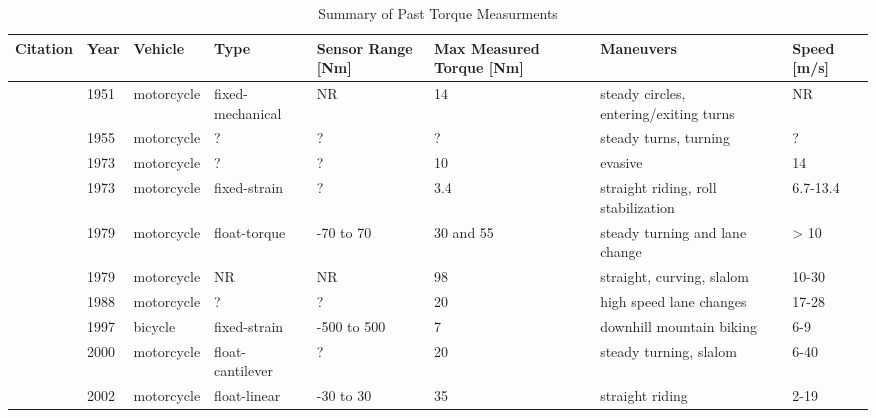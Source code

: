 \documentclass[10pt]{article}
\begin{document}
\begin{table}[!ht]
  \caption{Summary of Past Torque Measurments}
  \begin{tabular}{llllllll}
    \toprule
    Citation                              &  Year &     Vehicle &              Type & Sensor Range [Nm] & Max Measured Torque [Nm] &                               Maneuvers & Speed [m/s] \\
    \midrule
    \cite{Wilson-Jones1951}               &  1951 &  motorcycle &  fixed-mechanical &                NR &                       14 &  steady circles, entering/exiting turns &          NR \\
    \cite{Kondo1955}                      &  1955 &  motorcycle &                 ? &                 ? &                        ? &                   steady turns, turning &           ? \\
    \cite{Watanabe1973}                   &  1973 &  motorcycle &                 ? &                 ? &                       10 &                                 evasive &          14 \\
    \cite{Eaton1973}                      &  1973 &  motorcycle &      fixed-strain &                 ? &                      3.4 &     straight riding, roll stabilization &    6.7-13.4 \\
    \cite{Weir1979a}                      &  1979 &  motorcycle &      float-torque &         -70 to 70 &                30 and 55 &          steady turning and lane change &        > 10 \\
    \cite{Aoki}                           &  1979 &  motorcycle &                NR &                NR &                       98 &               straight, curving, slalom &       10-30 \\
    \cite{Sugizaki1988}                   &  1988 &  motorcycle &                 ? &                 ? &                       20 &                 high speed lane changes &       17-28 \\
    \cite{Lorenzo1997,Lorenzo1999}        &  1997 &     bicycle &      fixed-strain &       -500 to 500 &                        7 &                downhill mountain biking &         6-9 \\
    \cite{Bortoluzzi2000,Biral2003}       &  2000 &  motorcycle &  float-cantilever &                 ? &                       20 &                  steady turning, slalom &        6-40 \\
    \cite{James2002a,James2002,James2005} &  2002 &  motorcycle &      float-linear &         -30 to 30 &                       35 &                         straight riding &        2-19 \\

\end{tabular}
\end{table}
\end{document}
